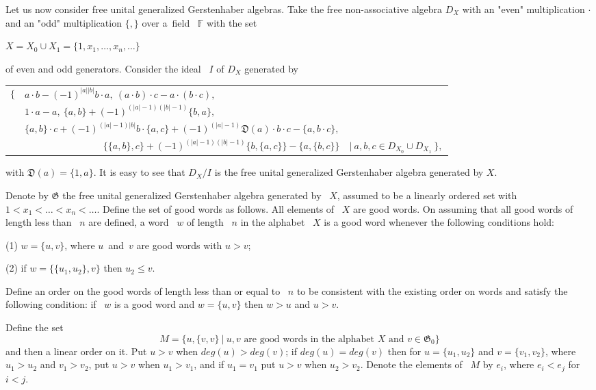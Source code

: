 \documentclass[secthm,seceqn,amsthm,ussrhead,reqno,12pt]{amsart}
\theoremstyle{plain}
\begin{document}
\medskip

Let us now consider free unital generalized Gerstenhaber algebras.
Take the free non-associative algebra 
$D_X$
with an "even" multiplication $\cdot$
and an  "odd" multiplication $\{,\}$
over a~field~%
$\mathbb{F}$
with the set
\begin{center}
    $X=X_0 \cup X_1=\{1,x_1, \ldots, x_n, \ldots\}$
\end{center}
of even and odd generators.
Consider the ideal~%
$I$
of
$D_X$
generated by 
\begin{longtable}{ccc}
$\Big\{$  
& \multicolumn{1}{l}{$  a\cdot b-(-1)^{|a||b|}b\cdot a, \ 
(a\cdot b)\cdot c - a\cdot (b\cdot c),$}\\
&\multicolumn{1}{l}{$   1 \cdot a-a, \
\{a,b\}+(-1)^{(|a|-1)(|b|-1)} \{b,a\},  $}\\
&$
\{a,b\}\cdot c+(-1)^{(|a|-1)|b|} b\cdot \{a,c\}+(-1)^{(|a|-1)}\mathfrak {\mathfrak D}(a)\cdot b\cdot c-\{a,b\cdot c\},
$\\

&\multicolumn{1}{r}{
$\{\{a,b\},c\} +(-1)^{(|a|-1)(|b|-1)}\{b,\{a,c\}\}-\{a,\{b,c\}\}$}&$ | \ a,b,c \in D_{X_0} \cup  D_{X_1}   \   \Big\},
$
\end{longtable}
with
$\mathfrak {\mathfrak D}(a)=\{1,a\}$.
It is easy to see  that
$D_X/I$
is the free unital generalized Gerstenhaber algebra generated by $X.$

\medskip 

Denote by
${\mathfrak G}$
the free unital generalized Gerstenhaber algebra
generated by~%
$X$,
assumed to be a linearly ordered set with
$1 <x_1 < \ldots < x_n < \ldots$.
Define the set of good words as follows.
All elements of~%
$X$
are good words.
On assuming that
all good words of length less than~%
$n$
are defined,
a word~%
$w$
of length~%
$n$
in the alphabet~%
$X$
is a good word
whenever the following conditions hold:

(1)
$w=\{u,v\}$, 
where
$u$~and~$v$
are good words with
$u>v$;

(2)
if
$w=\{\{u_1,u_2\},v\}$
then
$u_2\leq v$.

Define an order on the good words of length less than or equal to~%
$n$
to be consistent with the existing order on words
and satisfy the following condition: 
if~%
$w$
is a good word and
$w=\{u,v\}$
then
$w>u$
and
$u>v$.

Define the set
$$
M=\Big\{u,\{v,v\} \ |  \ u, v 
\mbox{ are good words in the alphabet $X$ and } v \in{\mathfrak G}_0\Big\}
$$
and then a linear order on it. %
Put 
$u>v$
when
$deg(u)>deg(v)$;
if
$deg(u)=deg(v)$
then for
$u=\{u_1,u_2\}$
and
$v=\{v_1,v_2\}$,
where
$u_1>u_2$
and
$v_1>v_2$,
put
$u>v$
when
$u_1>v_1$, 
and if
$u_1=v_1$
put
$u>v$
when
$u_2>v_2$.
Denote the elements of~%
$M$
by
$e_i$,
where 
$e_i<e_j$
for
$i<j$.
\end{document}
